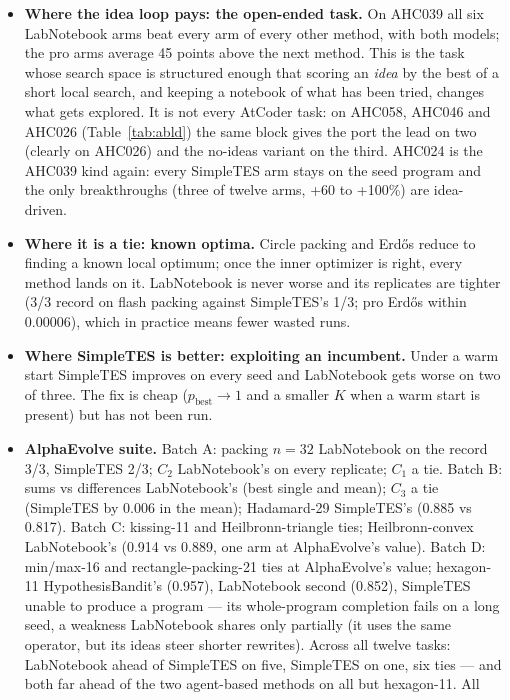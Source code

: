 \begin{itemize}
\item \textbf{Where the idea loop pays: the open-ended task.} On AHC039 all six LabNotebook arms
  beat every arm of every other method, with both models; the pro arms average 45 points above the
  next method. This is the task whose search space is structured enough that scoring an
  \emph{idea} by the best of a short local search, and keeping a notebook of what has been tried,
  changes what gets explored. It is not every AtCoder task: on AHC058, AHC046 and AHC026
  (Table~\ref{tab:abld}) the same block gives the port the lead on two (clearly on AHC026) and the
  no-ideas variant on the third. AHC024 is the AHC039 kind again: every SimpleTES arm stays on the
  seed program and the only breakthroughs (three of twelve arms, +60 to +100\%) are idea-driven.
\item \textbf{Where it is a tie: known optima.} Circle packing and Erd\H{o}s reduce to finding a
  known local optimum; once the inner optimizer is right, every method lands on it. LabNotebook is
  never worse and its replicates are tighter (3/3 record on flash packing against SimpleTES's 1/3;
  pro Erd\H{o}s within 0.00006), which in practice means fewer wasted runs.
\item \textbf{Where SimpleTES is better: exploiting an incumbent.} Under a warm start SimpleTES
  improves on every seed and LabNotebook gets worse on two of three. The fix is cheap
  ($p_{\text{best}}\to1$ and a smaller $K$ when a warm start is present) but has not been run.
\item \textbf{AlphaEvolve suite.} Batch A: packing $n{=}32$ LabNotebook on the record 3/3, SimpleTES
  2/3; $C_2$ LabNotebook's on every replicate; $C_1$ a tie. Batch B: sums vs differences LabNotebook's
  (best single and mean); $C_3$ a tie (SimpleTES by 0.006 in the mean); Hadamard-29 SimpleTES's
  (0.885 vs 0.817). Batch C: kissing-11 and Heilbronn-triangle ties; Heilbronn-convex LabNotebook's
  (0.914 vs 0.889, one arm at AlphaEvolve's value). Batch D: min/max-16 and rectangle-packing-21
  ties at AlphaEvolve's value; hexagon-11 HypothesisBandit's (0.957), LabNotebook second (0.852),
  SimpleTES unable to produce a program --- its whole-program completion fails on a long seed, a
  weakness LabNotebook shares only partially (it uses the same operator, but its ideas steer
  shorter rewrites). Across all twelve tasks: LabNotebook ahead of SimpleTES on five, SimpleTES on
  one, six ties --- and both far ahead of the two agent-based methods on all but hexagon-11. All

\end{itemize}
